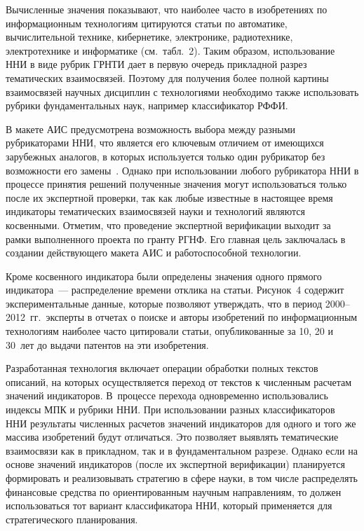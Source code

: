 \begin{multicols}{2}
Вычисленные значения показывают, что наиболее часто в изобретениях по информационным технологиям
цитируются статьи по автоматике, вычислительной технике, кибернетике,
электронике, радиотехнике, электротехнике и информатике (см.\ табл.~2). Таким
образом, использование ННИ в виде рубрик ГРНТИ дает в первую очередь
прикладной разрез тематических взаимосвязей. Поэтому для получения более
полной картины взаимосвязей научных дисциплин с технологиями необходимо
также использовать рубрики фундаментальных наук, например классификатор
РФФИ.

     В макете АИС предусмотрена возможность выбора между разными
рубрикаторами ННИ, что является его ключевым отличием от имеющихся
зарубежных аналогов, в которых используется только один рубрикатор без
возможности его замены~\cite{11-zat}. Однако при использовании любого
рубрикатора ННИ в процессе принятия решений полученные значения могут
использоваться только после их экспертной проверки, так как любые известные в
настоящее время индикаторы тематических взаимосвязей науки и технологий
являются косвенными. Отметим, что проведение экспертной верификации
выходит за рамки выполненного проекта по гранту РГНФ. Его главная цель
заключалась в создании действующего макета АИС и работоспособной
технологии.

     Кроме косвенного индикатора были определены значения одного прямого
индикатора~--- распределение времени отклика на статьи. Рисунок~4 содержит
экспериментальные данные, которые позволяют утверждать, что в период
     2000--2012~гг.\ эксперты в отчетах о поиске и авторы изобретений по
информационным технологиям наиболее часто цитировали статьи,
опубликованные за 10, 20 и 30~лет до выдачи патентов на эти изобретения.
{

}

     Разработанная технология включает операции обработки полных текстов
описаний, на которых осуществляется переход от текстов к численным расчетам
значений индикаторов. В~процессе перехода одновременно использовались
индексы МПК и рубрики ННИ. При использовании разных классификаторов ННИ
результаты численных расчетов значений индикаторов для одного и того же
массива изобретений будут отличаться. Это позволяет выявлять тематические
взаимосвязи как в прикладном, так и в фундаментальном разрезе. Однако если на
основе значений индикаторов (после их экспертной верификации) планируется
формировать и реализовывать стратегию в сфере науки, в том числе распределять
финансовые средства по ориентированным научным направлениям, то должен
использоваться тот вариант классификатора ННИ, который применяется для
стратегического планирования.
{ %

}
\end{multicols}
